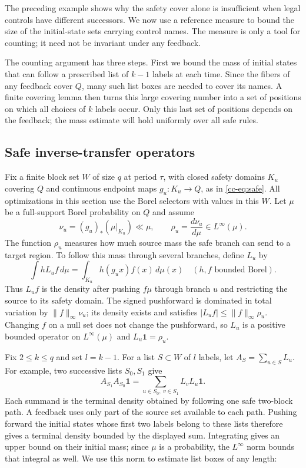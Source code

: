 \documentclass[11pt,reqno]{amsart}
\numberwithin{equation}{section}
\theoremstyle{definition}
\theoremstyle{definition}
\newcommand{\one}{\mathbf 1}
\begin{document}
The preceding example shows why the safety cover alone is insufficient
when legal controls have different successors. We now use a reference
measure to bound the size of the initial-state sets carrying control
names. The measure is only a tool for counting; it need not be
invariant under any feedback.

The counting argument has three steps. First we bound the mass of
initial states that can follow a prescribed list of $k-1$ labels at
each time. Since the fibers of any feedback cover $Q$, many such list
boxes are needed to cover its names. A finite covering lemma then turns
this large covering number into a set of positions on which all choices
of $k$ labels occur. Only this last set of positions depends on the
feedback; the mass estimate will hold uniformly over all safe rules.

\subsection{Safe inverse-transfer operators}
Fix a finite block set $W$ of size $q$ at period $\tau$, with
closed safety domains $K_u$ covering $Q$ and continuous endpoint
maps $g_u:K_u\to Q$, as in \eqref{cc-eq:safe}. All optimizations
in this section use the Borel selectors with values in this $W$.
Let $\mu$ be a full-support Borel probability on $Q$ and assume
\begin{equation}\label{eq:cap-density}
 \nu_u=(g_u)_*(\mu|_{K_u})\ll\mu,\qquad
 \rho_u=\frac{d\nu_u}{d\mu}\in L^\infty(\mu).
\end{equation}
The function $\rho_u$ measures how much source mass the safe branch
can send to a target region. To follow this mass through several
branches, define $L_u$ by
\begin{equation}\label{eq:cap-transfer}
 \int hL_uf\,d\mu=\int_{K_u}h(g_ux)f(x)\,d\mu(x)
 \quad(h,f\text{ bounded Borel}).
\end{equation}
Thus $L_uf$ is the density after pushing $f\mu$ through branch $u$
and restricting the source to its safety domain. The signed
pushforward is dominated in total variation by $\|f\|_\infty\nu_u$;
its density exists and satisfies
$|L_uf|\le\|f\|_\infty\rho_u$. Changing $f$ on a null set
does not change the pushforward, so $L_u$ is a positive bounded
operator on $L^\infty(\mu)$ and $L_u\one=\rho_u$.

Fix $2\le k\le q$ and set $l=k-1$. For a list $S\subset W$
of $l$ labels, let $A_S=\sum_{u\in S}L_u$. For example, two
successive lists $S_0,S_1$ give
\[
 A_{S_1}A_{S_0}\one
   =\sum_{u\in S_0,\ v\in S_1}L_vL_u\one.
\]
Each summand is the terminal density obtained by following one
safe two-block path. A feedback uses only part of the source set
available to each path. Pushing forward the initial states whose
first two labels belong to these lists therefore gives a terminal
density bounded by the displayed sum. Integrating gives an upper
bound on their initial
mass; since $\mu$ is a probability, the $L^\infty$ norm bounds that
integral as well. We use this norm to estimate list boxes of any length:
\end{document}
